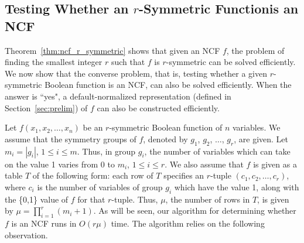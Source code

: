 \subsection{Testing Whether an $r$-Symmetric Function\newline is an NCF}
\label{sse:rsym_to_ncf}

Theorem~\ref{thm:ncf_r_symmetric} shows that given an NCF $f$,
the problem of finding the smallest integer $r$ such that
$f$ is $r$-symmetric can be solved efficiently.
We now show that the converse problem, that is, testing whether a given
$r$-symmetric Boolean function is an NCF,
can also be solved efficiently.
When the answer is ``yes", a
default-normalized representation (defined in Section~\ref{sec:prelim})
of $f$ can also be constructed efficiently.

Let $f(x_1, x_2, \ldots, x_n)$ be an $r$-symmetric 
Boolean function of $n$ variables.
We assume that the symmetry groups 
of $f$, denoted by $g_1$, $g_2$, $\ldots$, $g_r$,
are given.
Let $m_i = |g_i|$, $1 \leq i \leq m$.
Thus, in group $g_i$, the number
of variables which can take on the value 1 varies from 0
to $m_i$, $1 \leq i \leq r$.
We also assume that $f$ is
given as a table $T$ of the following form:
each row of $T$ specifies an $r$-tuple $(c_1, c_2, \ldots, c_r)$,
where $c_i$ is the number of variables of group $g_i$ which
have the value 1, along with the \{0,1\} value of $f$ for that $r$-tuple.
Thus, $\mu$, the number of rows in $T$, 
is given by  $\mu = \prod_{i=1}^r (m_i+1)$.
As will be seen, our algorithm for determining whether $f$ is
an NCF runs in $O(r\mu)$ time.
The algorithm relies on the following observation.

